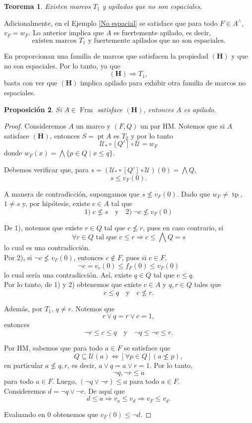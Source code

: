 \documentclass[12pt]{article}
\newtheorem{thm}{Teorema}[section]
\newtheorem{prop}[thm]{Proposición}
\DeclareMathOperator{\Frm}{Frm}
\DeclareMathOperator{\pt}{pt}
\DeclareMathOperator{\tp}{tp}
\begin{document}
\begin{thm}
Existen marcos $T_1$ y apilados que no son espaciales.
\end{thm}

Adicionalmente, en el Ejemplo \ref{No espacial} se satisface que para todo $F\in A^\wedge$, $v_F=w_F$. Lo anterior implica que $A$ es fuertemente apilado, es decir,
\[
\text{existen marcos }T_1 \text{ y fuertemente apilados que no son espaciales.}
\]

En \cite{PasekaSmarda1992} proporcionan una familia de marcos que satisfacen la propiedad $\mathbf{(H)}$ y que no son espaciales. Por lo tanto, ya que 
\[
\mathbf{(H)}\Longrightarrow T_1,
\]
basta con ver que $\mathbf{(H)}$ implica apilado para exhibir otra familia de marcos no espaciales.

\begin{prop}
Si $A\in \Frm$ satisface $\mathbf{(H)}$, entonces $A$ es apilado.
\end{prop}

\begin{proof}
Consideremos $A$ un marco y $(F, Q)$ un par HM. Notemos que si $A$ satisface $\mathbf{(H)}$, entonces $S=\pt A$ es $T_2$ y por lo tanto 
\[
\mathcal{U}_*\circ[Q']\circ \mathcal{U}=w_F
\]
donde $w_F(x)=\bigwedge\{p\in Q\mid x\leq q\}$.

Debemos verificar que, para $s=(\mathcal{U}_*\circ [Q']\circ \mathcal{U})(0)=\bigwedge Q$,
\[
s\leq v_F(0).
\]

A manera de contradicción, supongamos que $s\nleq v_F(0)$. Dado que $w_F\neq \tp$, $1\neq s$ y, por hipótesis, existe $c\in A$ tal que
\[
1)\;c\nleq s\quad\text{y}\quad 2)\;\neg c\nleq v_F(0)
\]

De 1), notemos que existe $r\in Q$ tal que $c\nleq r$, pues en caso contrario, si 
\[
\forall r\in Q\text{ tal que }c\leq r\Rightarrow c\leq \bigwedge Q=s
\]
lo cual es una contradicción.\\

Por 2), si $\neg c\nleq v_F(0)$, entonces $c\notin F$, pues si $c\in F$, 
\[
\neg c=v_c(0)\leq f_F(0)\leq v_F(0)
\]
lo cual sería una contradicción. Así, existe $q\in Q$ tal que $c\leq q$.\\

Por lo tanto, de 1) y 2) obtenemos que existe $c\in A$ y $q, r\in Q$ tales que
\[
c\leq q \quad\text{y}\quad c\nleq r.
\]

Además, por $T_1$, $q\neq r$. Notemos que 
\[
r\vee q=r\vee c=1,
\]
entonces
\[
\neg r\leq c\leq q\quad \text{y}\quad \neg q\leq \neg c\leq r. 
\]

Por HM, sabemos que para todo $a\in F$ se satisface que 
\[
Q\subseteq \mathcal{U}(a)\iff [\forall p\in Q](a\nleq p),
\]
en particular $a\nleq q, r$, es decir, $a\vee q=a\vee r=1$. Por lo tanto,
\[
\neg q, \neg r\leq a 
\]
para todo $a\in F$. Luego, $(\neg q\vee \neg r)\leq a$ para todo $a\in F$.\\

Consideremos $d=\neg q\vee \neg r$. De aquí que
\[
d\leq a\Rightarrow v_a\leq v_d\Rightarrow v_F\leq v_d.
\]

Evaluando en $0$ obtenemos que $v_F(0)\leq \neg d$.
\end{proof}
\end{document}
